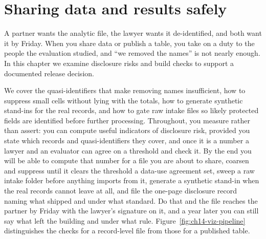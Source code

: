 \documentclass[
    a4paper,
    fontsize=10pt,
    twoside=true,
    numbers=noenddot,
]{kaobook}
\begin{document}
\chapter{Sharing data and results safely}\label{ch:sharing}

A partner wants the analytic file, the lawyer wants it de-identified, and both want it by Friday. When you share data or publish a table, you take on a duty to the people the evaluation studied, and \enquote{we removed the names} is not nearly enough. In this chapter we examine disclosure risks and build checks to support a documented release decision.

We cover the quasi-identifiers that make removing names insufficient, how to suppress small cells without lying with the totals, how to generate synthetic stand-ins for the real records, and how to gate raw intake files so likely protected fields are identified before further processing.  Throughout, you measure rather than assert: you can compute useful indicators of disclosure risk, provided you state which records and quasi-identifiers they cover, and once it is a number a lawyer and an evaluator can agree on a threshold and check it. By the end you will be able to compute that number for a file you are about to share, coarsen and suppress until it clears the threshold a data-use agreement set, sweep a raw intake folder before anything imports from it, generate a synthetic stand-in when the real records cannot leave at all, and file the one-page disclosure record naming what shipped and under what standard. Do that and the file reaches the partner by Friday with the lawyer's signature on it, and a year later you can still say what left the building and under what rule. Figure~\ref{fig:ch14-viz-pipeline} distinguishes the checks for a record-level file from those for a published table.
\end{document}
